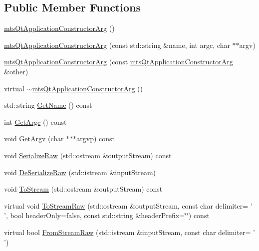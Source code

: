 \subsection*{Public Member Functions}
\begin{DoxyCompactItemize}
\item 
\hyperlink{classmts_qt_application_constructor_arg_afcd358dad87343a7b3116206bfce7e2e}{mts\-Qt\-Application\-Constructor\-Arg} ()
\item 
\hyperlink{classmts_qt_application_constructor_arg_afc38ecc80313f2757a47ae960b782863}{mts\-Qt\-Application\-Constructor\-Arg} (const std\-::string \&name, int argc, char $\ast$$\ast$argv)
\item 
\hyperlink{classmts_qt_application_constructor_arg_abca1e32780f6396a85a105b680ecc6f5}{mts\-Qt\-Application\-Constructor\-Arg} (const \hyperlink{classmts_qt_application_constructor_arg}{mts\-Qt\-Application\-Constructor\-Arg} \&other)
\item 
virtual \hyperlink{classmts_qt_application_constructor_arg_af5fdd1e0560d96d9c61c37501a5291a5}{$\sim$mts\-Qt\-Application\-Constructor\-Arg} ()
\item 
std\-::string \hyperlink{classmts_qt_application_constructor_arg_a4fb28fa4e6cfb6a01458d33f00c69164}{Get\-Name} () const 
\item 
int \hyperlink{classmts_qt_application_constructor_arg_a226bb4c49431296da7981a7fc0de7c34}{Get\-Argc} () const 
\item 
void \hyperlink{classmts_qt_application_constructor_arg_a23489b12ec7629950875cfd039657a73}{Get\-Argv} (char $\ast$$\ast$$\ast$argvp) const 
\item 
void \hyperlink{classmts_qt_application_constructor_arg_aa6562b7c1a3d19ef8356d5bb570fe072}{Serialize\-Raw} (std\-::ostream \&output\-Stream) const 
\item 
void \hyperlink{classmts_qt_application_constructor_arg_a60a48ec89c96b33d7d5bd61809d09a6b}{De\-Serialize\-Raw} (std\-::istream \&input\-Stream)
\item 
void \hyperlink{classmts_qt_application_constructor_arg_a6d1e2aadac2c41e45bbabc01892d6d34}{To\-Stream} (std\-::ostream \&output\-Stream) const 
\item 
virtual void \hyperlink{classmts_qt_application_constructor_arg_adab540a9de65d898b488a3628bf46bf3}{To\-Stream\-Raw} (std\-::ostream \&output\-Stream, const char delimiter= ' ', bool header\-Only=false, const std\-::string \&header\-Prefix=\char`\"{}\char`\"{}) const 
\item 
virtual bool \hyperlink{classmts_qt_application_constructor_arg_affc0d2d62bde80207d708f5e20ab1188}{From\-Stream\-Raw} (std\-::istream \&input\-Stream, const char delimiter= ' ')
\end{DoxyCompactItemize}


